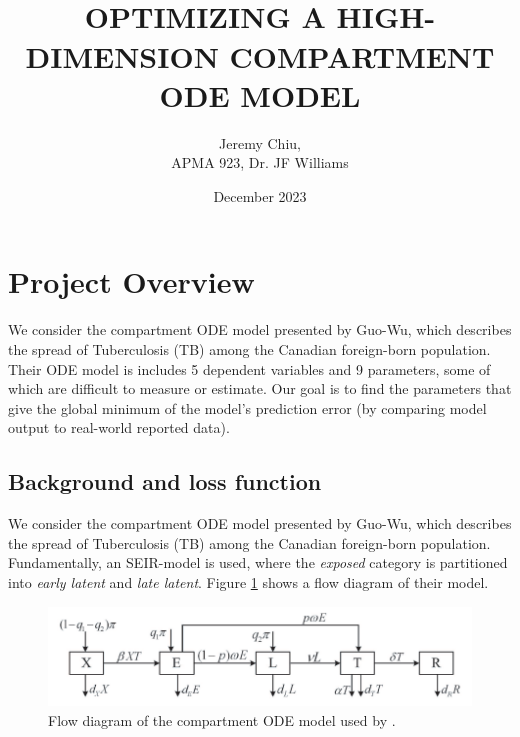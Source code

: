 \documentclass{article}
\begin{document}
\title{ \normalsize \textsc{}
	\\ [2.0cm]
	\Large \textbf{\uppercase{Optimizing a High-Dimension Compartment ODE Model}
}
}
\date{December 2023}
\author{Jeremy Chiu,\\APMA 923, Dr. JF Williams} 
	

\maketitle

\section{Project Overview}

We consider the compartment ODE model presented by Guo-Wu\cite{GuoWu}, which describes the spread of Tuberculosis (TB) among the Canadian foreign-born population.  Their ODE model is includes 5 dependent variables and 9 parameters, some of which are difficult to measure or estimate.  Our goal is to find the parameters that give the global minimum of the model's prediction error (by comparing model output to real-world reported data).

\subsection{Background and loss function}


We consider the compartment ODE model presented by Guo-Wu\cite{GuoWu}, which describes the spread of Tuberculosis (TB) among the Canadian foreign-born population.  Fundamentally, an SEIR-model is used, where the \textit{exposed} category is partitioned into \textit{early latent} and \textit{late latent}.  Figure \ref{fig:flow} shows a flow diagram of their model.

\begin{figure}
		\includegraphics[scale=0.4]{xeltr flow diagram}
		\caption{Flow diagram of the compartment ODE model used by \cite{GuoWu}.}
		\label{fig:flow}
\end{figure}
\end{document}
